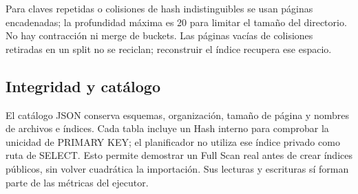Para claves repetidas o colisiones de hash indistinguibles se usan páginas encadenadas; la profundidad máxima es 20 para limitar el tamaño del directorio. No hay contracción ni merge de buckets. Las páginas vacías de colisiones retiradas en un split no se reciclan; reconstruir el índice recupera ese espacio.

\subsection{Integridad y catálogo}
El catálogo JSON conserva esquemas, organización, tamaño de página y nombres de archivos e índices. Cada tabla incluye un Hash interno para comprobar la unicidad de PRIMARY KEY; el planificador no utiliza ese índice privado como ruta de SELECT. Esto permite demostrar un Full Scan real antes de crear índices públicos, sin volver cuadrática la importación. Sus lecturas y escrituras sí forman parte de las métricas del ejecutor.
